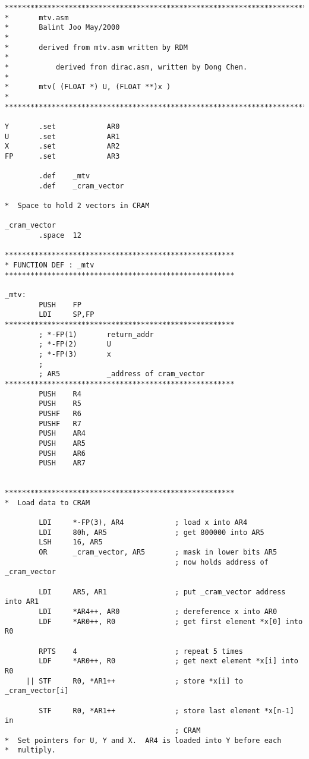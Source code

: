 {\scriptsize
\begin{verbatim}
************************************************************************
*       mtv.asm
*       Balint Joo May/2000
*
*       derived from mtv.asm written by RDM
*
*           derived from dirac.asm, written by Dong Chen.
*
*       mtv( (FLOAT *) U, (FLOAT **)x )
*
************************************************************************

Y       .set            AR0
U       .set            AR1
X       .set            AR2
FP      .set            AR3

        .def    _mtv
        .def    _cram_vector

*  Space to hold 2 vectors in CRAM

_cram_vector
        .space  12

******************************************************
* FUNCTION DEF : _mtv
******************************************************

_mtv:
        PUSH    FP
        LDI     SP,FP
******************************************************
        ; *-FP(1)       return_addr
        ; *-FP(2)       U
        ; *-FP(3)       x
        ;
        ; AR5           _address of cram_vector
******************************************************
        PUSH    R4
        PUSH    R5
        PUSHF   R6
        PUSHF   R7
        PUSH    AR4
        PUSH    AR5
        PUSH    AR6
        PUSH    AR7


******************************************************
*  Load data to CRAM

        LDI     *-FP(3), AR4            ; load x into AR4
        LDI     80h, AR5                ; get 800000 into AR5 
        LSH     16, AR5
        OR      _cram_vector, AR5       ; mask in lower bits AR5
                                        ; now holds address of _cram_vector

        LDI     AR5, AR1                ; put _cram_vector address into AR1
        LDI     *AR4++, AR0             ; dereference x into AR0
        LDF     *AR0++, R0              ; get first element *x[0] into R0

        RPTS    4                       ; repeat 5 times
        LDF     *AR0++, R0              ; get next element *x[i] into R0
     || STF     R0, *AR1++              ; store *x[i] to _cram_vector[i]

        STF     R0, *AR1++              ; store last element *x[n-1] in 
                                        ; CRAM
*  Set pointers for U, Y and X.  AR4 is loaded into Y before each
*  multiply.


\end{verbatim}}
